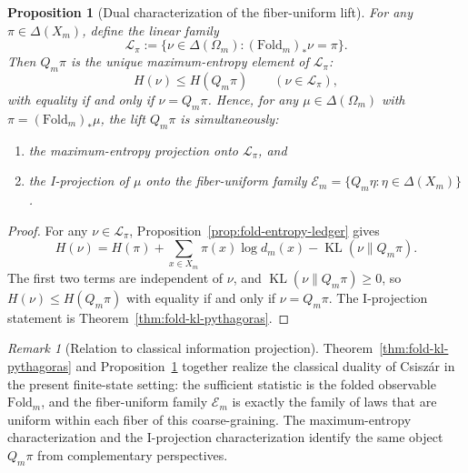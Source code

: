 \documentclass[11pt,letterpaper]{article}
\numberwithin{equation}{section}
\theoremstyle{plain}
\newtheorem{proposition}[theorem]{Proposition}
\theoremstyle{definition}
\theoremstyle{remark}
\newtheorem{remark}[theorem]{Remark}
\newcommand{\Fold}{\mathrm{Fold}}
\DeclareMathOperator{\KL}{KL}
\begin{document}
\begin{proposition}[Dual characterization of the fiber-uniform lift]
\label{prop:dual-projection-maxent}
For any \(\pi\in\Delta(X_m)\), define the linear family
\[
\mathcal L_\pi:=\{\nu\in\Delta(\Omega_m):(\Fold_m)_*\nu=\pi\}.
\]
Then \(Q_m\pi\) is the unique maximum-entropy element of
\(\mathcal L_\pi\):
\[
H(\nu)\le H(Q_m\pi)
\qquad(\nu\in\mathcal L_\pi),
\]
with equality if and only if \(\nu=Q_m\pi\). Hence, for any
\(\mu\in\Delta(\Omega_m)\) with \(\pi=(\Fold_m)_*\mu\), the lift
\(Q_m\pi\) is simultaneously:
\begin{enumerate}
\item the maximum-entropy projection onto \(\mathcal L_\pi\), and
\item the I-projection of \(\mu\) onto the fiber-uniform family
  \(\mathcal E_m=\{Q_m\eta:\eta\in\Delta(X_m)\}\).
\end{enumerate}
\end{proposition}

\begin{proof}
For any \(\nu\in\mathcal L_\pi\),
Proposition~\ref{prop:fold-entropy-ledger} gives
\[
H(\nu)
=
H(\pi)+\sum_{x\in X_m}\pi(x)\log d_m(x)-\KL(\nu\|Q_m\pi).
\]
The first two terms are independent of \(\nu\), and
\(\KL(\nu\|Q_m\pi)\ge 0\), so \(H(\nu)\le H(Q_m\pi)\) with equality if and
only if \(\nu=Q_m\pi\). The I-projection statement is
Theorem~\ref{thm:fold-kl-pythagoras}.
\end{proof}

\begin{remark}[Relation to classical information projection]\label{rem:fold-kl-pythagoras-classical}
Theorem~\ref{thm:fold-kl-pythagoras} and
Proposition~\ref{prop:dual-projection-maxent} together realize the classical
duality of Csisz\'ar \cite{Csiszar1975IdivergenceGeometry} in the present
finite-state setting: the sufficient statistic is the folded observable
\(\Fold_m\), and the fiber-uniform family \(\mathcal E_m\) is exactly the
family of laws that are uniform within each fiber of this coarse-graining.
The maximum-entropy characterization and the I-projection characterization
identify the same object \(Q_m\pi\) from complementary perspectives.
\end{remark}
\end{document}
